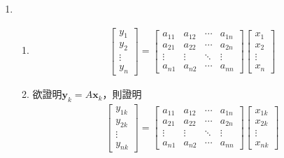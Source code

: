 \documentclass[12pt]{article}
\begin{document}
    \begin{enumerate}
        \item \begin{enumerate}
            \item \begin{align*}
                \begin{bmatrix}
                    y_1\\y_2\\\vdots\\y_n
                \end{bmatrix}=\begin{bmatrix}
                    a_{11}&a_{12}&\cdots&a_{1n}\\
                    a_{21}&a_{22}&\cdots&a_{2n}\\
                    \vdots&\vdots&\ddots&\vdots\\
                    a_{n1}&a_{n2}&\cdots&a_{nn}
                \end{bmatrix}\begin{bmatrix}
                    x_1\\x_2\\\vdots\\x_n
                \end{bmatrix}
            \end{align*}
            \item 欲證明$\mathbf{y}_k=A\mathbf{x}_k$，則證明\begin{align*}
                \begin{bmatrix}
                    y_{1k}\\y_{2k}\\\vdots\\y_{nk}
                \end{bmatrix}=\begin{bmatrix}
                    a_{11}&a_{12}&\cdots&a_{1n}\\
                    a_{21}&a_{22}&\cdots&a_{2n}\\
                    \vdots&\vdots&\ddots&\vdots\\
                    a_{n1}&a_{n2}&\cdots&a_{nn}
                \end{bmatrix}\begin{bmatrix}
                    x_{1k}\\x_{2k}\\\vdots\\x_{nk}
                \end{bmatrix}
            \end{align*}

\end{enumerate}
\end{enumerate}
\end{document}
